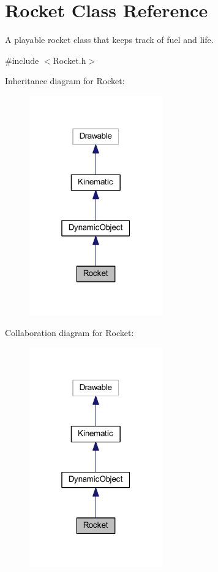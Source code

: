 \hypertarget{class_rocket}{}\section{Rocket Class Reference}
\label{class_rocket}


A playable rocket class that keeps track of fuel and life.  




{\ttfamily \#include $<$Rocket.\+h$>$}



Inheritance diagram for Rocket\+:\nopagebreak
\begin{figure}[H]
\begin{center}
\leavevmode
\includegraphics[width=163pt]{class_rocket__inherit__graph}
\end{center}
\end{figure}


Collaboration diagram for Rocket\+:\nopagebreak
\begin{figure}[H]
\begin{center}
\leavevmode
\includegraphics[width=163pt]{class_rocket__coll__graph}
\end{center}
\end{figure}
